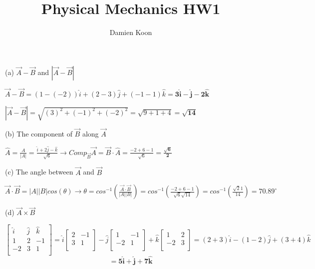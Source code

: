 \documentclass[12pt]{article}
\date{\vspace{-4ex}}
\title{Physical Mechanics HW1}
\author{Damien Koon}
\begin{document}
\maketitle




\hfill \break

(a) $\vec{A} - \vec{B}$ and $|\vec{A} - \vec{B}|$

\hfill \break

$
\vec{A} - \vec{B} = (1-(-2))\hat{i} + (2 - 3)\hat{j} + (-1 - 1)\hat{k} = \boldsymbol{3\hat{i} - \hat{j} -2\hat{k}}
$ 

$
|\vec{A} - \vec{B}| =  \sqrt{(3)^2 + (-1)^2 + (-2)^2} = \sqrt{9 + 1 + 4} = \boldsymbol{\sqrt{14}}
$

\hfill \break

(b) The component of $\vec{B}$ along $\vec{A}$ 

$
\hat{A} = \frac{A}{|A|} = \frac{\hat{i} + 2\hat{j} - \hat{k}}{\sqrt{6}} \rightarrow Comp_{\vec{B}} \vec{A} = \vec{B} \cdot \hat{A} = \frac{-2 + 6 - 1}{\sqrt{6}} = \boldsymbol{\frac{\sqrt{6}}{2}}
$

\hfill \break

(c) The angle between $\vec{A}$ and $\vec{B}$

$
\vec{A} \cdot \vec{B} = |A||B|cos(\theta) \rightarrow \theta = cos^{-1}(\frac{\vec{A} \cdot \vec{B}}{|A||B|}) = cos^{-1}(\frac{-2 + 6 -1}{\sqrt{6} \sqrt{14}}) = cos^{-1}(\frac{\sqrt21}{14}) = \boldsymbol{70.89^{\circ}}
$

\hfill \break

(d) $\vec{A} \times \vec{B}$

$$
\begin{bmatrix}
    \hat{i} & \hat{j} & \hat{k} \\
	1 & 2 & -1\\
	-2 & 3 & 1 \\
\end{bmatrix}
= \hat{i}
\begin{bmatrix}
	2 & -1\\
	3 & 1 \\
\end{bmatrix}
- \hat{j}
\begin{bmatrix}
	1 & -1\\
	-2 & 1 \\
\end{bmatrix}
+ \hat{k}
\begin{bmatrix}
	1 & 2\\
	-2 & 3 \\
\end{bmatrix}
= (2 + 3)\hat{i} - (1 - 2) \hat{j} + (3 + 4) \hat{k} 
$$
$$
= \boldsymbol{5\hat{i} + \hat{j} + 7 \hat{k}}
$$
\end{document}
